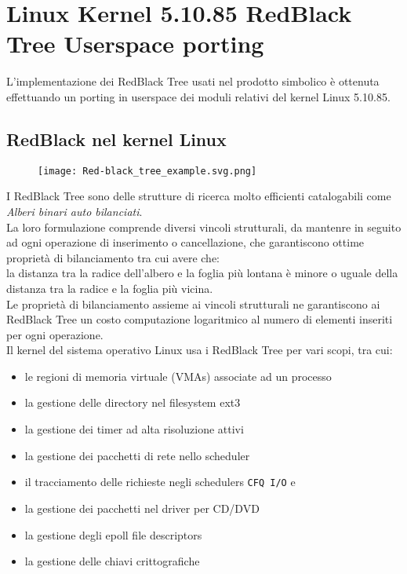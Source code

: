 \section{Linux Kernel 5.10.85 RedBlack Tree Userspace porting} \label{chSpMMAux:linuxRBTree}
L'implementazione dei RedBlack Tree usati nel prodotto simbolico è ottenuta effettuando un porting in 
userspace dei moduli relativi del kernel Linux 5.10.85.\\
\subsection{RedBlack nel kernel Linux}
\begin{figure}[H]
  \centering \texttt{[image: Red-black\_tree\_example.svg.png]}
  \caption[Rappresentazione grafica di un RedBlack Tree]
  \decoRule \label{fig:rbtree}
\end{figure}
I RedBlack Tree sono delle strutture di ricerca molto efficienti catalogabili come 
\emph{Alberi binari auto bilanciati}.\\%
La loro formulazione comprende diversi vincoli strutturali, da mantenre in seguito ad ogni operazione di inserimento o cancellazione,
che garantiscono ottime proprietà di bilanciamento tra cui avere che:\\ %
la distanza tra la radice dell'albero e la foglia più lontana è minore o uguale della distanza tra la radice e la foglia più vicina.\\
Le proprietà di bilanciamento assieme ai vincoli strutturali ne garantiscono ai RedBlack Tree
un costo computazione logaritmico al numero di elementi inseriti per ogni operazione.\\
\voidLine
Il kernel del sistema operativo Linux usa i RedBlack Tree per vari scopi, tra cui:
\begin{itemize}
	\item	le regioni di memoria virtuale (VMAs) associate ad un processo
	\item	la gestione delle directory nel filesystem ext3
	\item	la gestione dei timer ad alta risoluzione attivi
	\item	la gestione dei pacchetti di rete nello scheduler 
	\item	il tracciamento delle richieste negli schedulers \verb|CFQ I/O| e 
	\item	la gestione dei pacchetti nel driver per CD/DVD
	\item	la gestione degli epoll file descriptors
	\item	la gestione delle chiavi crittografiche
\end{itemize}  
